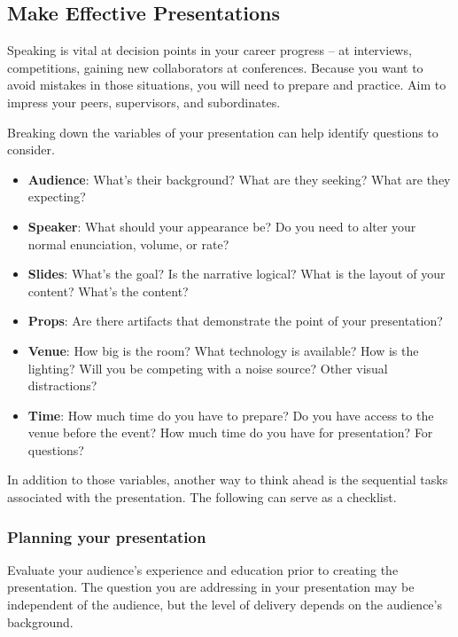 \subsection*{Make Effective Presentations\label{sec:effective-presentations}}


Speaking is vital at decision points in your career progress -- at interviews, competitions, gaining new collaborators at conferences. 
Because you want to avoid mistakes in those situations, you will need to prepare and practice.
Aim to impress your peers, supervisors, and subordinates. 

Breaking down the variables of your presentation can help identify questions to consider. 
\begin{itemize}
    \item \textbf{Audience}: What's their background? What are they seeking? What are they expecting?
    \item \textbf{Speaker}: What should your appearance be? Do you need to alter your normal enunciation, volume, or rate?
    \item \textbf{Slides}: What's the goal? Is the narrative logical? What is the layout of your content? What's the content? 
    \item \textbf{Props}: Are there artifacts that demonstrate the point of your presentation?
    \item \textbf{Venue}: How big is the room? What technology is available? How is the lighting? Will you be competing with a noise source? Other visual distractions?
    \item \textbf{Time}: How much time do you have to prepare? Do you have access to the venue before the event? How much time do you have for presentation? For questions?
\end{itemize}

In addition to those variables, another way to think ahead is the sequential tasks associated with the presentation. 
The following can serve as a checklist.

\subsubsection*{Planning your presentation}

Evaluate your audience's experience and education prior to creating the presentation. The question you are addressing in your presentation may be independent of the audience, but the level of delivery depends on the audience's background.

